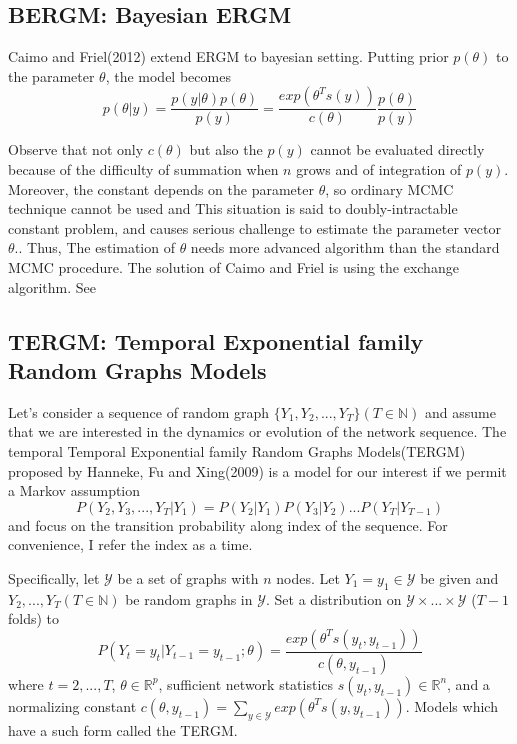 \documentclass[aspectratio=169,ignorenonframetext,9pt]{beamer}
\theoremstyle{plain}
\theoremstyle{definition}
\begin{document}
\subsection{BERGM: Bayesian ERGM}
Caimo and Friel(2012) %
extend ERGM to bayesian setting. Putting prior $p(\theta)$ to the parameter $\theta$, the model becomes
\[p(\theta|y)=\frac{p(y|\theta)p(\theta)}{p(y)}=\frac{exp(\theta^T s(y))}{c(\theta)}\frac{p(\theta)}{p(y)}\]

Observe that not only $c(\theta)$ but also the $p(y)$ cannot be evaluated directly
because of the difficulty of summation when $n$ grows and of integration of $p(y)$.
Moreover, the constant depends on the parameter $\theta$, so ordinary MCMC technique cannot be used and
This situation is said to doubly-intractable constant problem, and causes serious challenge to estimate the parameter vector $\theta$..
Thus, The estimation of $\theta$ needs more advanced algorithm than the standard MCMC procedure.
The solution of Caimo and Friel is using the exchange algorithm. See %



\subsection{TERGM: Temporal Exponential family Random Graphs Models}
Let's consider a sequence of random graph $\{Y_1, Y_2, ..., Y_T\} (T\in\mathbb{N})$ and assume that
we are interested in the dynamics or evolution of the network sequence.
The temporal Temporal Exponential family Random Graphs Models(TERGM)
proposed by Hanneke, Fu and Xing(2009)%
is a model for our interest if we permit a Markov assumption
\[P(Y_2,Y_3,...,Y_T|Y_1)=P(Y_2|Y_1)P(Y_3|Y_2)...P(Y_T|Y_{T-1})\]
and focus on the transition probability along index of the sequence.
For convenience, I refer the index as a time.

Specifically, let $\mathcal{Y}$ be a set of graphs with $n$ nodes. 
Let $Y_1=y_1 \in \mathcal{Y}$ be given and $Y_2,...,Y_T (T\in\mathbb{N})$ be random graphs in $\mathcal{Y}$.
Set a distribution on $\mathcal{Y}\times ... \times \mathcal{Y}$ ($T-1$ folds) to
\[P(Y_t=y_t|Y_{t-1}=y_{t-1};\theta) = \frac{exp(\theta^{T}s(y_t, y_{t-1}))}{c(\theta, y_{t-1})}\]
where $t=2,...,T$, $\theta\in\mathbb{R}^p$,
sufficient network statistics $s(y_t, y_{t-1})\in\mathbb{R}^n$,
and a normalizing constant $c(\theta, y_{t-1})=\sum_{y\in\mathcal{Y}}exp(\theta^{T}s(y, y_{t-1}))$.
Models which have a such form called the TERGM.
\end{document}
